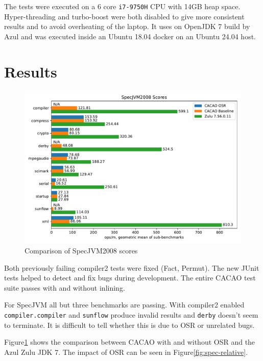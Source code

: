 \documentclass[draft,final]{vutinfth} %
\begin{document}
    The tests were executed on a 6 core \texttt{i7-9750H} CPU with 14GB heap space.
    Hyper-threading and turbo-boost were both disabled to give more consistent results and to avoid overheating of the laptop.
    It uses on OpenJDK 7 build by Azul and was executed inside an Ubuntu 18.04 docker on an Ubuntu 24.04 host.


    \section{Results}

    \begin{figure}
        \centering
        \includegraphics[width=\textwidth]{../evaluation/specjvm/plots/plot3_grouped}
        \caption{Comparison of SpecJVM2008 scores}
        \label{fig:spec-cmp}
    \end{figure}


    Both previously failing compiler2 tests were fixed (Fact, Permut).
    The new JUnit tests helped to detect and fix bugs during development.
    The entire CACAO test suite passes with and without inlining.

    For SpecJVM all but three benchmarks are passing.
    With compiler2 enabled \lstinline{compiler.compiler} and \lstinline{sunflow} produce invalid results and \lstinline{derby} doesn't seem to terminate.
    It is difficult to tell whether this is due to OSR or unrelated bugs.

    Figure\ref{fig:spec-cmp} shows the comparison between CACAO with and without OSR
    and the Azul Zulu JDK 7.
    The impact of OSR can be seen in Figure\ref{fig:spec-relative}.
\end{document}
